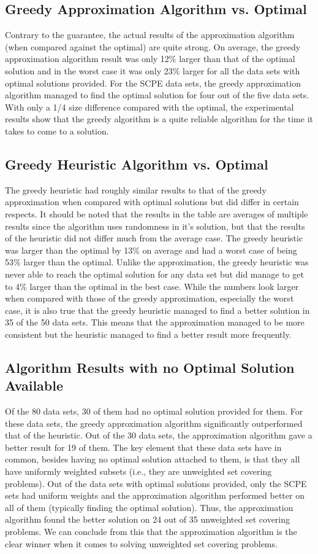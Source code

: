 \documentclass{report}
\begin{document}
\subsection{Greedy Approximation Algorithm vs. Optimal}
Contrary to the guarantee, the actual results of the approximation algorithm (when compared against the optimal) are quite strong. On average, the greedy approximation algorithm result was only 12\% larger than that of the optimal solution and in the worst case it was only 23\% larger for all the data sets with optimal solutions provided. For the SCPE data sets, the greedy approximation algorithm managed to find the optimal solution for four out of the five data sets. With only a 1/4 size difference compared with the optimal, the experimental results show that the greedy algorithm is a quite reliable algorithm for the time it takes to come to a solution.

\subsection{Greedy Heuristic Algorithm vs. Optimal}
The greedy heuristic had roughly similar results to that of the greedy approximation when compared with optimal solutions but did differ in certain respects. It should be noted that the results in the table are averages of multiple results since the algorithm uses randomness in it's solution, but that the results of the heuristic did not differ much from the average case. The greedy heuristic was larger than the optimal by 13\% on average and had a worst case of being 53\% larger than the optimal. Unlike the approximation, the greedy heuristic was never able to reach the optimal solution for any data set but did manage to get to 4\% larger than the optimal in the best case. While the numbers look larger when compared with those of the greedy approximation, especially the worst case, it is also true that the greedy heuristic managed to find a better solution in 35 of the 50 data sets. This means that the approximation managed to be more consistent but the heuristic managed to find a better result more frequently.

\subsection{Algorithm Results with no Optimal Solution Available}
Of the 80 data sets, 30 of them had no optimal solution provided for them. For these data sets, the greedy approximation algorithm significantly outperformed that of the heuristic. Out of the 30 data sets, the approximation algorithm gave a better result for 19 of them. The key element that these data sets have in common, besides having no optimal solution attached to them, is that they all have uniformly weighted subsets (i.e., they are unweighted set covering problems). Out of the data sets with optimal solutions provided, only the SCPE sets had uniform weights and the approximation algorithm performed better on all of them (typically finding the optimal solution). Thus, the approximation algorithm found the better solution on 24 out of 35 unweighted set covering problems. We can conclude from this that the approximation algorithm is the clear winner when it comes to solving unweighted set covering problems.
\end{document}
